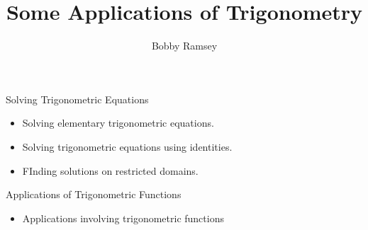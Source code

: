 \documentclass{ximera}
\author{Bobby Ramsey}
\title{Some Applications of Trigonometry}
\begin{document}
\begin{abstract}
\end{abstract}
\maketitle


\begin{objectives}
	\item Solving Trigonometric Equations
		\begin{itemize}
			\item Solving elementary trigonometric equations.
			\item Solving trigonometric equations using identities.
			\item FInding solutions on restricted domains.
		\end{itemize}
	
	\item Applications of Trigonometric Functions
		\begin{itemize}
			\item Applications involving trigonometric functions
		\end{itemize}
\end{objectives}
\end{document}
